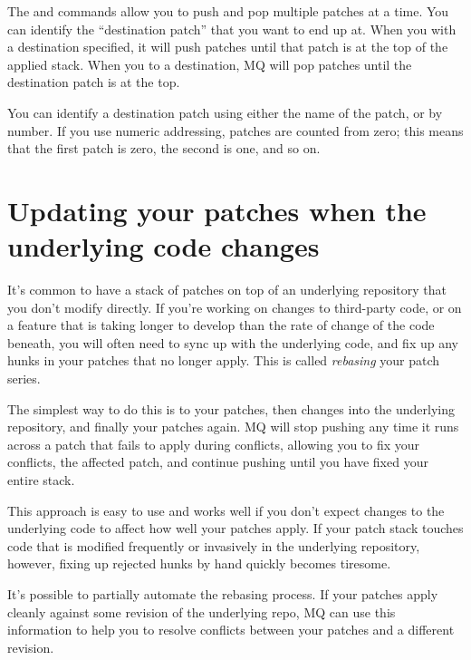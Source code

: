 The  and  commands allow you to push and pop
multiple patches at a time.  You can identify the ``destination
patch'' that you want to end up at.  When you  with a
destination specified, it will push patches until that patch is at the
top of the applied stack.  When you  to a destination, MQ
will pop patches until the destination patch is at the top.

You can identify a destination patch using either the name of the
patch, or by number.  If you use numeric addressing, patches are
counted from zero; this means that the first patch is zero, the second
is one, and so on.

\section{Updating your patches when the underlying code changes}
\label{sec:mq:merge}

It's common to have a stack of patches on top of an underlying
repository that you don't modify directly.  If you're working on
changes to third-party code, or on a feature that is taking longer to
develop than the rate of change of the code beneath, you will often
need to sync up with the underlying code, and fix up any hunks in your
patches that no longer apply.  This is called \emph{rebasing} your
patch series.

The simplest way to do this is to 
your patches, then  changes into the underlying
repository, and finally  your
patches again.  MQ will stop pushing any time it runs across a patch
that fails to apply during conflicts, allowing you to fix your
conflicts,  the affected patch, and continue pushing
until you have fixed your entire stack.

This approach is easy to use and works well if you don't expect
changes to the underlying code to affect how well your patches apply.
If your patch stack touches code that is modified frequently or
invasively in the underlying repository, however, fixing up rejected
hunks by hand quickly becomes tiresome.

It's possible to partially automate the rebasing process.  If your
patches apply cleanly against some revision of the underlying repo, MQ
can use this information to help you to resolve conflicts between your
patches and a different revision.

